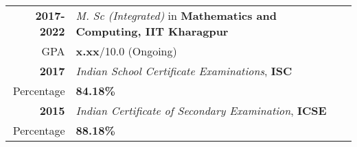 \documentclass[a4paper,10pt]{extarticle} %
\begin{document}
\begin{tabular}{r|p{17.5cm}}	
\textbf{2017-2022} & \textit{M. Sc (Integrated)} in \textbf{Mathematics and Computing, IIT Kharagpur}\\
\hfill GPA & \textbf{x.xx}/10.0 (Ongoing)\\
\textbf{2017} & \textit{Indian School Certificate Examinations}, \textbf{ISC}\\
\hfill Percentage & \textbf{84.18\%}\\
\textbf{2015} & \textit{Indian Certificate of Secondary Examination}, \textbf{ICSE}\\
\hfill Percentage & \textbf{88.18\%} \\
\end{tabular}


\vspace{-0.3cm}
\end{document}
